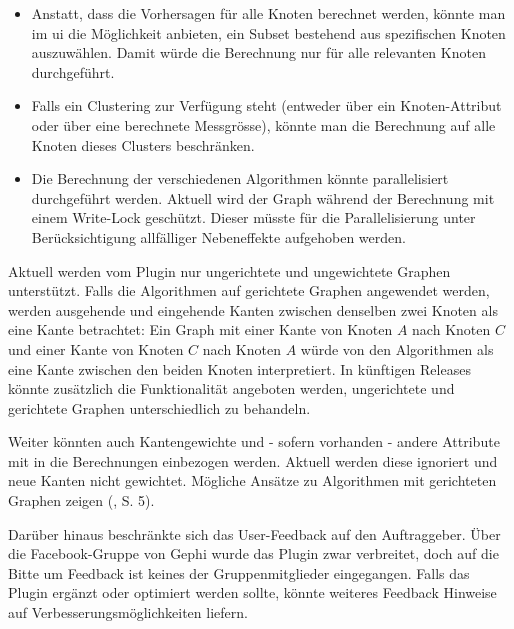 \begin{itemize}
    \item Anstatt, dass die Vorhersagen für alle Knoten berechnet werden, könnte man im \acs{ui} die Möglichkeit anbieten, ein Subset bestehend aus spezifischen Knoten auszuwählen. Damit würde die Berechnung nur für alle relevanten Knoten durchgeführt.
    \item Falls ein Clustering zur Verfügung steht (entweder über ein Knoten-Attribut oder über eine berechnete Messgrösse), könnte man die Berechnung auf alle Knoten dieses Clusters beschränken.
    \item Die Berechnung der verschiedenen Algorithmen könnte parallelisiert durchgeführt werden. Aktuell wird der Graph während der Berechnung mit einem Write-Lock geschützt. Dieser müsste für die Parallelisierung unter Berücksichtigung allfälliger Nebeneffekte aufgehoben werden.
\end{itemize}

Aktuell werden vom Plugin nur ungerichtete und ungewichtete Graphen unterstützt.
Falls die Algorithmen auf gerichtete Graphen angewendet werden, werden ausgehende und eingehende Kanten zwischen denselben zwei Knoten als eine Kante betrachtet:
Ein Graph mit einer Kante von Knoten $A$ nach Knoten $C$ und einer Kante von Knoten $C$ nach Knoten $A$ würde von den Algorithmen als eine Kante zwischen den beiden Knoten interpretiert.
In künftigen Releases könnte zusätzlich die Funktionalität angeboten werden, ungerichtete und gerichtete Graphen unterschiedlich zu behandeln.

Weiter könnten auch Kantengewichte und - sofern vorhanden - andere Attribute mit in die Berechnungen einbezogen werden.
Aktuell werden diese ignoriert und neue Kanten nicht gewichtet. Mögliche Ansätze zu Algorithmen mit gerichteten Graphen zeigen \citeauthor{garcia-gasulla_pdf_2014} (\citeyear{garcia-gasulla_pdf_2014}, S. 5).

Darüber hinaus beschränkte sich das User-Feedback auf den Auftraggeber.
Über die Facebook-Gruppe von Gephi wurde das Plugin zwar verbreitet, doch auf die Bitte um Feedback ist keines der Gruppenmitglieder eingegangen.
Falls das Plugin ergänzt oder optimiert werden sollte, könnte weiteres Feedback Hinweise auf Verbesserungsmöglichkeiten liefern.
